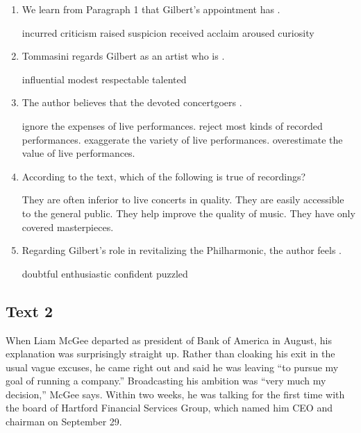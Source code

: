 \begin{enumerate}[resume]
	\item
 We learn from Paragraph 1 that Gilbert's appointment has \lineread.


\fourchoices
{incurred criticism}
{raised suspicion}
{received acclaim}
{aroused curiosity}



\item
Tommasini regards Gilbert as an artist who is \lineread.


\fourchoices
{influential}
{modest}
{respectable}
{talented}




\item
The author believes that the devoted concertgoers \lineread.


\fourchoices
{ignore the expenses of live performances.}
{reject most kinds of recorded performances.}
{exaggerate the variety of live performances.}
{overestimate the value of live performances.}


\item
 According to the text, which of the following is
true of recordings?


\fourchoices
{They are often inferior to live concerts in quality.}
{They are easily accessible to the general public.}
{They help improve the quality of music.}
{They have only covered masterpieces.}



\item
Regarding Gilbert's role in revitalizing the
Philharmonic, the author feels \lineread.


\fourchoices
{doubtful}
{enthusiastic}
{confident}
{puzzled}




\end{enumerate}



\newpage
\subsection{Text 2}


When Liam McGee departed as president of Bank of America in August, his
explanation was surprisingly straight up. Rather than cloaking his exit
in the usual vague excuses, he came right out and said he was leaving
``to pursue my goal of running a company.'' Broadcasting his ambition
was ``very much my decision,'' McGee says. Within two weeks, he was
talking for the first time with the board of Hartford Financial Services
Group, which named him CEO and chairman on September 29.

